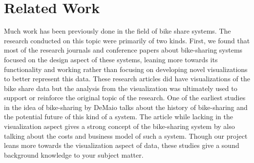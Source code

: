 \section{Related Work} 
\label{sec:related_work}

Much work has been previously done in the field of bike share systems. The research conducted on this topic were primarily of two kinds. First, we found that most of the research journals and conference papers about bike-sharing systems focused on the design aspect of these systems, leaning more towards its functionality and working rather than focusing on developing novel visualizations to better represent this data. These research articles did have visualizations of the bike share data but the analysis from the visualization was ultimately used to support or reinforce the original topic of the research. One of the earliest studies in the idea of bike-sharing by DeMaio \cite{DeMaio:2009:MetroBike} talks about the history of bike-sharing and the potential future of this kind of a system. The article while lacking in the visualization aspect gives a strong concept of the bike-sharing system by also talking about the costs and business model of such a system. Though our project leans more towards the visualization aspect of data, these studies give a sound background knowledge to your subject matter. 

